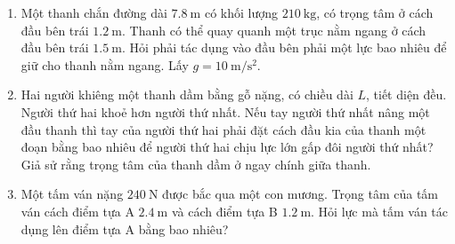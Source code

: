 \begin{enumerate}[label=\bfseries Bài \arabic*:, leftmargin=1.5cm]
	\item Một thanh chắn đường dài $\SI{7.8}{\meter}$ có khối lượng $\SI{210}{\kilogram}$, có trọng tâm ở cách đầu bên trái $\SI{1.2}{\meter}$. Thanh có thể quay quanh một trục nằm ngang ở cách đầu bên trái $\SI{1.5}{\meter}$. Hỏi phải tác dụng vào đầu bên phải một lực bao nhiêu để giữ cho thanh nằm ngang. Lấy $g=\SI{10}{\meter/\second^2}$.
	
	\item Hai người khiêng một thanh dầm bằng gỗ nặng, có chiều dài $L$, tiết diện đều. Người thứ hai khoẻ hơn người thứ nhất. Nếu tay người thứ nhất nâng một đầu thanh thì tay của người thứ hai phải đặt cách đầu kia của thanh một đoạn bằng bao nhiêu để người thứ hai chịu lực lớn gấp đôi người thứ nhất? Giả sử rằng trọng tâm của thanh dầm ở ngay chính giữa thanh.
	
	\item Một tấm ván nặng $\SI{240}{\newton}$ được bắc qua một con mương. Trọng tâm của tấm ván cách điểm tựa A $\SI{2.4}{\meter}$ và cách điểm tựa B $\SI{1.2}{\meter}$. Hỏi lực mà tấm ván tác dụng lên điểm tựa A bằng bao nhiêu?


\end{enumerate}
